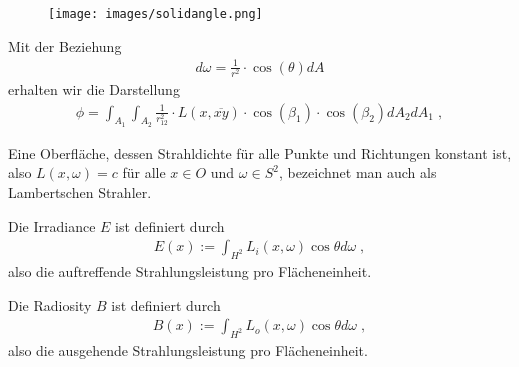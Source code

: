 \begin{figure}[H]
        \centering
         \texttt{[image: images/solidangle.png]}
    \label{fig:shadowmap3}
\end{figure}
Mit der Beziehung 
\begin{align}
d\omega =  \frac{1}{r^2} \cdot  \cos(\theta) dA
\end{align}     
erhalten wir die Darstellung
\begin{align}
\phi = \int_{A_1} \int_{A_2} \frac{1}{r_{12}^2}  \cdot L(x, \overline{xy}) \cdot \cos(\beta_1) \cdot \cos(\beta_2)  d A_2 dA_1 \; ,
\end{align}

\begin{Definition}
Eine Oberfläche, dessen Strahldichte für alle Punkte und Richtungen konstant ist, also
$L(x, \omega) = c$  für alle $x \in O$ und $\omega \in S^2$, bezeichnet man auch als Lambertschen Strahler. 
\end{Definition}

\begin{Definition}
Die Irradiance $E$ ist definiert durch
\begin{align}
E(x) := \int_{H^2} L_i(x, \omega) \cos{\theta} d\omega \; ,
\end{align}
also die auftreffende Strahlungsleistung pro Flächeneinheit. 
\end{Definition}

\begin{Definition}
Die Radiosity $B$ ist definiert durch
\begin{align}
B(x) := \int_{H^2} L_o(x, \omega) \cos{\theta} d\omega \; ,
\end{align}
also die ausgehende Strahlungsleistung pro Flächeneinheit. 
\end{Definition}




